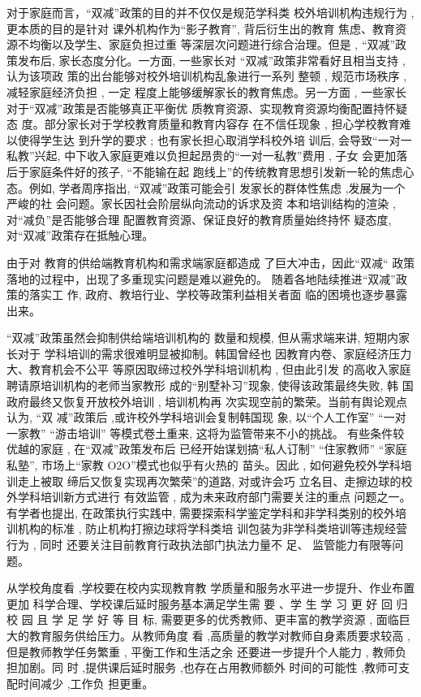 \documentclass[a4paper]{book}
\numberwithin{equation}{chapter}
\theoremstyle{definition}
\begin{document}
对于家庭而言，“双减”政策的目的并不仅仅是规范学科类
校外培训机构违规行为 ,
更本质的目的是针对
课外机构作为“影子教育”,
背后衍生出的教育
焦虑、教育资源不均衡以及学生、家庭负担过重
等深层次问题进行综合治理。但是 ,
“双减”政
策发布后,
家长态度分化。一方面,
一些家长对
“双减”政策非常看好且相当支持 ,
认为该项政
策的出台能够对校外培训机构乱象进行一系列
整顿 ,
规范市场秩序 ,
减轻家庭经济负担 ,
一定
程度上能够缓解家长的教育焦虑。另一方面 ,
一些家长对于“双减”政策是否能够真正平衡优
质教育资源、实现教育资源均衡配置持怀疑态
度。部分家长对于学校教育质量和教育内容存
在不信任现象 ,
担心学校教育难以使得学生达
到升学的要求 ;
也有家长担心取消学科校外培
训后,
会导致“一对一私教”兴起,
中下收入家庭更难以负担起昂贵的“一对一私教”费用 ,
子女
会更加落后于家庭条件好的孩子,
“不能输在起
跑线上”的传统教育思想引发新一轮的焦虑心
态。例如,
学者周序指出,
“双减”政策可能会引
发家长的群体性焦虑\cite{ref4} ,发展为一个严峻的社
会问题。家长因社会阶层纵向流动的诉求及资
本和培训结构的渲染 ,
对“减负”是否能够合理
配置教育资源、保证良好的教育质量始终持怀
疑态度,
对“双减”政策存在抵触心理。

由于对
教育的供给端教育机构和需求端家庭都造成
了巨大冲击，因此“双减“
政策落地的过程中，出现了多重现实问题是难以避免的。
随着各地陆续推进“双减”政策的落实工
作,
政府、教培行业、学校等政策利益相关者面
临的困境也逐步暴露出来。

“双减”政策虽然会抑制供给端培训机构的
数量和规模,
但从需求端来讲,
短期内家长对于
学科培训的需求很难明显被抑制。韩国曾经也
因教育内卷、家庭经济压力大、教育机会不公平
等原因取缔过校外学科培训机构 ,
但由此引发
的高收入家庭聘请原培训机构的老师当家教形
成的“别墅补习”现象,
使得该政策最终失败,
韩
国政府最终又恢复开放校外培训 ,
培训机构再
次实现空前的繁荣。当前有舆论观点认为,
“双
减”政策后 ,或许校外学科培训会复制韩国现
象,
以“个人工作室”
“一对一家教”
“游击培训”
等模式卷土重来,
这将为监管带来不小的挑战。
有些条件较优越的家庭 ,
在“双减”政策发布后
已经开始谋划搞“私人订制”
“住家教师”
“家庭
私塾”,
市场上“家教 O2O”模式也似乎有火热的
苗头。因此 ,
如何避免校外学科培训走上被取
缔后又恢复实现再次繁荣”的道路,
对或许会巧
立名目、走擦边球的校外学科培训新方式进行
有效监管 ,
成为未来政府部门需要关注的重点
问题之一。有学者也提出,
在政策执行实践中,
需要探索科学鉴定学科和非学科类别的校外培
训机构的标准 ,
防止机构打擦边球将学科类培
训包装为非学科类培训等违规经营行为 ,
同时
还要关注目前教育行政执法部门执法力量不
足、
监管能力有限等问题。\cite{ref5}

从学校角度看 ,学校要在校内实现教育教
学质量和服务水平进一步提升、作业布置更加
科学合理、学校课后延时服务基本满足学生需
要 、学 生 学 习 更 好 回 归 校 园 且 学 足 学 好 等 目
标,
需要更多的优秀教师、更丰富的教学资源 ,
面临巨大的教育服务供给压力。从教师角度
看 ,高质量的教学对教师自身素质要求较高 ,
但是教师教学任务繁重 ,
平衡工作和生活之余
还要进一步提升个人能力 ,
教师负担加剧。同
时 ,提供课后延时服务 ,也存在占用教师额外
时间的可能性 ,教师可支配时间减少 ,工作负
担更重。
\end{document}
